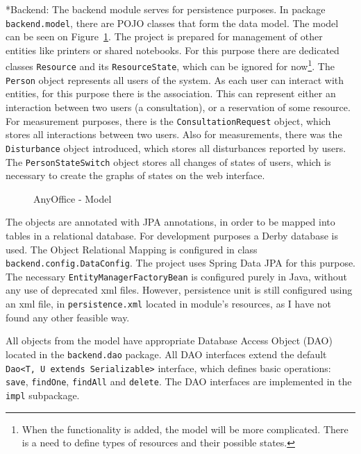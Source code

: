 \documentclass[11pt,singleside]{myfithesis2}
\makeatletter
\newcommand{\pict}[4]{
	\begin{figure}[h!]
  		\vspace{-7px}
  		\centerline{\fcolorbox{darkgray}{palegray}{\texttt{[image: \#2]}}}
  		\caption{#1}
  		\label{#4}
	\end{figure}
}
\renewcommand\paragraph{
   \vspace{-10pt}
   \@startsection{paragraph}{4}{0mm}
      {\baselineskip}
      {- 5pt}
      {\normalfont\normalsize\bfseries}
}
\makeatother
\begin{document}
\paragraph*{Backend: } The backend module serves for persistence purposes. In package \texttt{backend.model}, there are POJO classes that form the data model. The model can be seen on Figure~\ref{pic:anyofficeModel}. The project is prepared for management of other entities like printers or shared notebooks. For this purpose there are dedicated classes \texttt{Resource} and its \texttt{ResourceState}, which can be ignored for now\footnote{When the functionality is added, the model will be more complicated. There is a need to define types of resources and their possible states.}. The \texttt{Person} object represents all users of the system. As each user can interact with entities, for this purpose there is the association. This can represent either an interaction between two users (a consultation), or a reservation of some resource. For measurement purposes, there is the \texttt{ConsultationRequest} object, which stores all interactions between two users. Also for measurements, there was the \texttt{Disturbance} object introduced, which stores all disturbances reported by users. The \texttt{PersonStateSwitch} object stores all changes of states of users, which is necessary to create the graphs of states on the web interface. 

\pict{AnyOffice - Model}{data/model.png}{width=0.8\textwidth}{pic:anyofficeModel}

The objects are annotated with JPA annotations, in order to be mapped into tables in a relational database. For development purposes a Derby database is used. The Object Relational Mapping is configured in class \texttt{backend.config.DataConfig}. The project uses Spring Data JPA for this purpose. The necessary \texttt{EntityManagerFactoryBean} is configured purely in Java, without any use of deprecated xml files. However, persistence unit is still configured using an xml file, in \texttt{persistence.xml} located in module's resources, as I have not found any other feasible way. 

All objects from the model have appropriate Database Access Object (DAO) located in the \texttt{backend.dao} package. All DAO interfaces extend the default \texttt{Dao<T, U extends Serializable>} interface, which defines basic operations: \texttt{save}, \texttt{findOne}, \texttt{findAll} and \texttt{delete}. The DAO interfaces are implemented in the \texttt{impl} subpackage.
\end{document}
